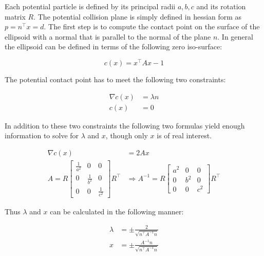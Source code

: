 Each potential particle is defined by its principal radii $a,b,c$ and its rotation matrix $R$. The potential collision plane is simply defined in hessian form as $p = n^\top x=d$. The first step is to compute the contact point on the surface of the ellipsoid with a normal that is parallel to the normal of the plane $n$. In general the ellipsoid can be defined in terms of the following zero iso-surface:

\begin{equation}
c(x) = x^\top A x - 1
\end{equation}

The potential contact point has to meet the following two constraints:

\begin{align}
\nabla c(x)&=\lambda n \\
c(x) &= 0
\end{align}

In addition to these two constraints the following two formulas yield enough information to solve for $\lambda$ and $x$, though only $x$ is of real interest.

\begin{align}
\nabla c(x)&=2 A x \\
A = R \begin{bmatrix}\frac{1}{a^2} & 0 & 0 \\ 0 & \frac{1}{b^2} & 0 \\ 0 & 0 & \frac{1}{c^2}\end{bmatrix} R^\top &\Rightarrow A^{-1} = R \begin{bmatrix}a^2 & 0 & 0 \\ 0 & b^2 & 0 \\ 0 & 0 & c^2\end{bmatrix}R^\top
\end{align}

Thus $\lambda$ and $x$ can be calculated in the following manner:

\begin{align}
\lambda &= \pm \frac{2}{\sqrt{n^\top A^{-1} n}} \\
x &= \pm \frac{A^{-1}n}{\sqrt{n^\top A^{-1} n}}
\end{align}

